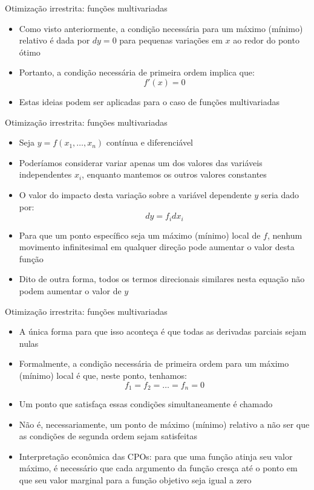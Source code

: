 \documentclass[10pt]{beamer}
\begin{document}
\begin{frame}
    {Otimização irrestrita: funções multivariadas}
    \begin{itemize}
        \item Como visto anteriormente, a condição necessária para um máximo (mínimo) relativo é dada por $dy = 0$ para pequenas variações em $x$ ao redor do ponto ótimo\bigskip
        \item Portanto, a condição necessária de primeira ordem implica que:
        \[
          f'(x) = 0  
        \]
        \item Estas ideias podem ser aplicadas para o caso de funções multivariadas
    \end{itemize}
\end{frame}

\begin{frame}
    {Otimização irrestrita: funções multivariadas}
    \begin{itemize}
        \item Seja $y = f(x_1,\dots,x_n)$ contínua e diferenciável\bigskip
        \item Poderíamos considerar variar apenas um dos valores das variáveis independentes $x_i$, enquanto mantemos os outros valores constantes\bigskip
        \item O valor do impacto desta variação sobre a variável dependente $y$ seria dado por:
        \[
          dy = f_i dx_i  
        \]
        \item Para que um ponto específico seja um máximo (mínimo) local de $f$, nenhum movimento infinitesimal em qualquer direção pode aumentar o valor desta função\bigskip
        \item Dito de outra forma, todos os termos direcionais similares nesta equação não podem aumentar o valor de $y$
    \end{itemize}
\end{frame}

\begin{frame}
    {Otimização irrestrita: funções multivariadas}
    \begin{itemize}
        \item A única forma para que isso aconteça é que todas as derivadas parciais sejam nulas\bigskip
        \item Formalmente, a condição necessária de primeira ordem para um máximo (mínimo) local é que, neste ponto, tenhamos:
        \[
          f_1 = f_2 = \dots = f_n = 0  
        \]
        \item Um ponto que satisfaça essas condições simultaneamente é chamado \bigskip
        \item Não é, necessariamente, um ponto de máximo (mínimo) relativo a não ser que as condições de segunda ordem sejam satisfeitas\bigskip
        \item Interpretação econômica das CPOs: para que uma função atinja seu valor máximo, é necessário que cada argumento da função cresça até o ponto em que seu valor marginal para a função objetivo seja igual a zero
    \end{itemize}
\end{frame}
\end{document}
